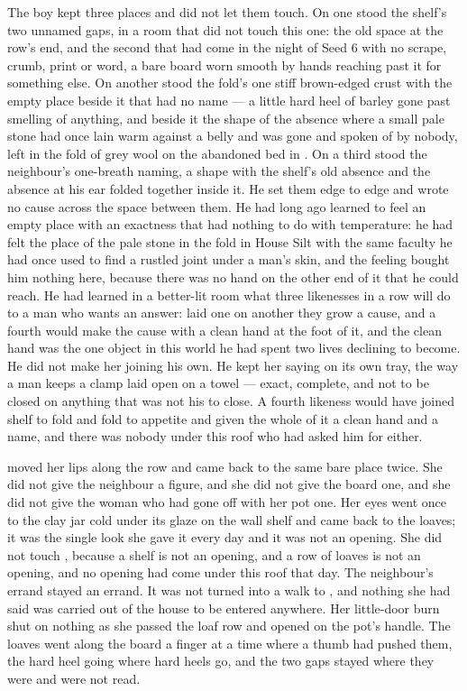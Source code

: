 The boy kept three places and did not let them touch. On one stood the shelf's two unnamed gaps, in a room that did not touch this one: the old space at the row's end, and the second that had come in the night of Seed 6 with no scrape, crumb, print or word, a bare board worn smooth by hands reaching past it for something else. On another stood the fold's one stiff brown-edged crust with the empty place beside it that had no name --- a little hard heel of barley gone past smelling of anything, and beside it the shape of the absence where a small pale stone had once lain warm against a belly and was gone and spoken of by nobody, left in the fold of grey wool on the abandoned bed in . On a third stood the neighbour's one-breath naming, a shape with the shelf's old absence and the absence at his ear folded together inside it. He set them edge to edge and wrote no cause across the space between them. He had long ago learned to feel an empty place with an exactness that had nothing to do with temperature: he had felt the place of the pale stone in the fold in House Silt with the same faculty he had once used to find a rustled joint under a man's skin, and the feeling bought him nothing here, because there was no hand on the other end of it that he could reach. He had learned in a better-lit room what three likenesses in a row will do to a man who wants an answer: laid one on another they grow a cause, and a fourth would make the cause with a clean hand at the foot of it, and the clean hand was the one object in this world he had spent two lives declining to become. He did not make her joining his own. He kept her saying on its own tray, the way a man keeps a clamp laid open on a towel --- exact, complete, and not to be closed on anything that was not his to close. A fourth likeness would have joined shelf to fold and fold to appetite and given the whole of it a clean hand and a name, and there was nobody under this roof who had asked him for either.

 moved her lips along the row and came back to the same bare place twice. She did not give the neighbour a figure, and she did not give the board one, and she did not give the woman who had gone off with her pot one. Her eyes went once to the clay jar cold under its glaze on the wall shelf and came back to the loaves; it was the single look she gave it every day and it was not an opening. She did not touch , because a shelf is not an opening, and a row of loaves is not an opening, and no opening had come under this roof that day. The neighbour's errand stayed an errand. It was not turned into a walk to , and nothing she had said was carried out of the house to be entered anywhere. Her little-door burn shut on nothing as she passed the loaf row and opened on the pot's handle. The loaves went along the board a finger at a time where a thumb had pushed them, the hard heel going where hard heels go, and the two gaps stayed where they were and were not read.


